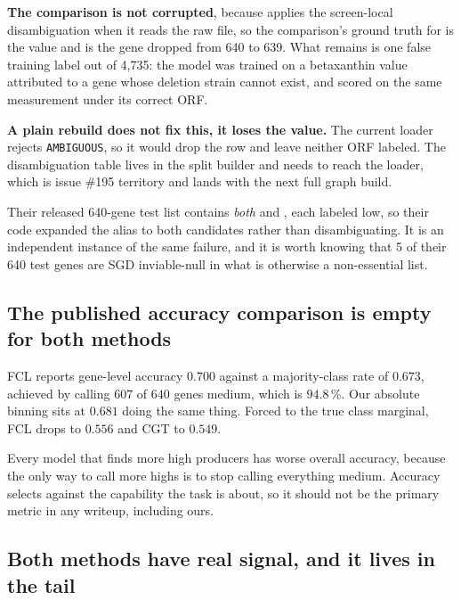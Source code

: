 \textbf{The comparison is not corrupted}, because  applies
the screen-local disambiguation when it reads the raw file, so the comparison's ground truth
for  is the  value and  is the gene dropped from 640
to 639. What remains is one false training label out of 4,735: the model was trained on a
betaxanthin value attributed to a gene whose deletion strain cannot exist, and scored on the
same measurement under its correct ORF.

\textbf{A plain rebuild does not fix this, it loses the value.} The current loader rejects
\texttt{AMBIGUOUS}, so it would drop the row and leave neither ORF labeled. The
disambiguation table lives in the split builder and needs to reach the loader, which is
issue \#195 territory and lands with the next full graph build.

 Their released 640-gene test
list contains \emph{both}  and , each labeled low, so their code
expanded the alias to both candidates rather than disambiguating. It is an independent
instance of the same failure, and it is worth knowing that 5 of their 640 test genes are
SGD inviable-null in what is otherwise a non-essential list.

\subsection{The published accuracy comparison is empty for both methods}

FCL reports gene-level accuracy $0.700$ against a majority-class rate of $0.673$, achieved
by calling $607$ of $640$ genes medium, which is $94.8\,\%$. Our absolute binning sits at
$0.681$ doing the same thing. Forced to the true class marginal, FCL drops to $0.556$ and
CGT to $0.549$.

 Every model that finds more high producers has worse overall
accuracy, because the only way to call more highs is to stop calling everything medium.
Accuracy selects against the capability the task is about, so it should not be the primary
metric in any writeup, including ours.

\subsection{Both methods have real signal, and it lives in the tail}

